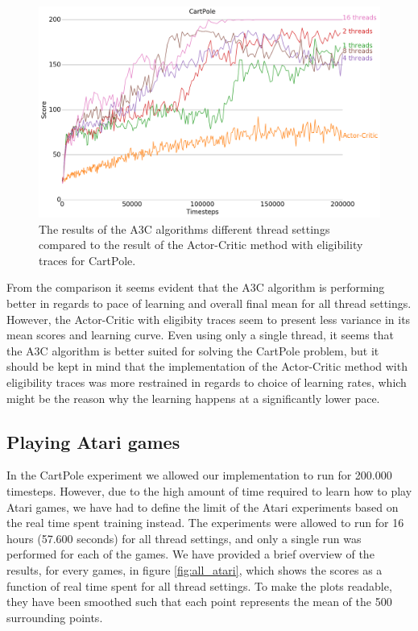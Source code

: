 \documentclass[11pt]{article}
\begin{document}
\begin{figure}[H]
    \centering
    \includegraphics[scale=0.4]{plots/cartpole_compare_counter_with_AC.png}
    \caption{The results of the A3C algorithms different thread
            settings compared to the result of the Actor-Critic method
            with eligibility traces for CartPole.}
    \label{fig:a3c_comp_eligibility}
\end{figure}

From the comparison it seems evident that the A3C algorithm is performing
better in regards to pace of learning and overall final mean for all thread settings.
However, the Actor-Critic with eligibity traces seem to present less variance
in its mean scores and learning curve.
Even using only a single thread, it seems that the A3C algorithm
is better suited for solving the CartPole problem, but it should
be kept in mind that the implementation of the Actor-Critic method
with eligibility traces was more restrained in regards to choice of
learning rates, which might be the reason why the learning happens
at a significantly lower pace.

\subsection{Playing Atari games}

In the CartPole experiment we allowed our implementation to run for 200.000 timesteps.
However, due to the high amount of time required to
learn how to play Atari games, we have had to define the limit of the
Atari experiments based on the real time spent training instead.
The experiments were allowed to run for 16 hours (57.600 seconds)
for all thread settings, and only a single run was performed for
each of the games.
We have provided a brief overview of the results, for every games, in figure \ref{fig:all_atari},
which shows the scores as a function of real time spent for all
thread settings.
To make the plots readable, they have been smoothed such that
each point represents the mean of the 500 surrounding points.
\end{document}
